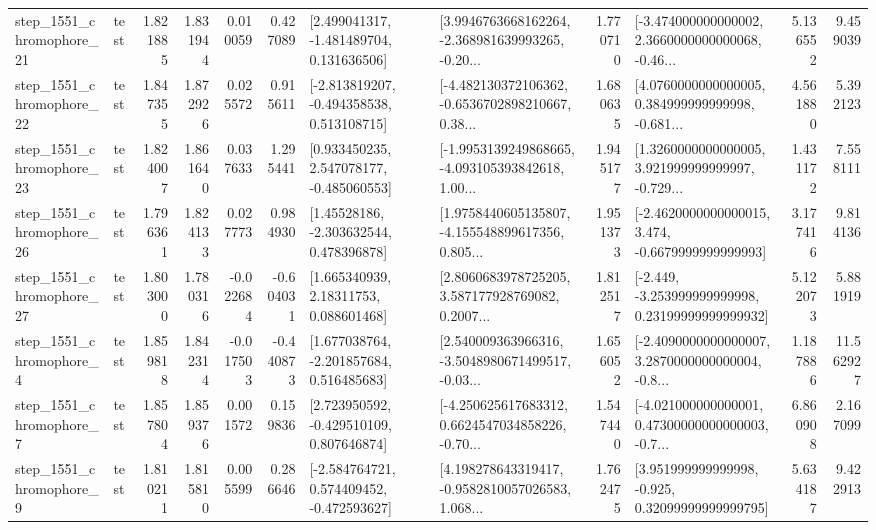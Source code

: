 \begin{tabular}{llrrrrllrlrr}
 step\_1551\_chromophore\_21 &      test &      1.821885 &    1.831944 &      0.010059 &  0.427089 &    [2.499041317, -1.481489704, 0.131636506] &  [3.9946763668162264, -2.368981639993265, -0.20... &       1.770710 &  [-3.474000000000002, 2.3660000000000068, -0.46... &            5.136552 &          9.459039 \\
 step\_1551\_chromophore\_22 &      test &      1.847355 &    1.872926 &      0.025572 &  0.915611 &   [-2.813819207, -0.494358538, 0.513108715] &  [-4.482130372106362, -0.6536702898210667, 0.38... &       1.680635 &  [4.0760000000000005, 0.384999999999998, -0.681... &            4.561880 &          5.392123 \\
 step\_1551\_chromophore\_23 &      test &      1.824007 &    1.861640 &      0.037633 &  1.295441 &    [0.933450235, 2.547078177, -0.485060553] &  [-1.9953139249868665, -4.093105393842618, 1.00... &       1.945177 &  [1.3260000000000005, 3.921999999999997, -0.729... &            1.431172 &          7.558111 \\
 step\_1551\_chromophore\_26 &      test &      1.796361 &    1.824133 &      0.027773 &  0.984930 &     [1.45528186, -2.303632544, 0.478396878] &  [1.9758440605135807, -4.155548899617356, 0.805... &       1.951373 &  [-2.4620000000000015, 3.474, -0.6679999999999993] &            3.177416 &          9.814136 \\
 step\_1551\_chromophore\_27 &      test &      1.803000 &    1.780316 &     -0.022684 & -0.604031 &      [1.665340939, 2.18311753, 0.088601468] &  [2.8060683978725205, 3.587177928769082, 0.2007... &       1.812517 &  [-2.449, -3.253999999999998, 0.23199999999999932] &            5.122073 &          5.881919 \\
  step\_1551\_chromophore\_4 &      test &      1.859818 &    1.842314 &     -0.017503 & -0.440873 &    [1.677038764, -2.201857684, 0.516485683] &  [2.540009363966316, -3.5048980671499517, -0.03... &       1.656052 &  [-2.4090000000000007, 3.2870000000000004, -0.8... &            1.187886 &         11.562927 \\
  step\_1551\_chromophore\_7 &      test &      1.857804 &    1.859376 &      0.001572 &  0.159836 &    [2.723950592, -0.429510109, 0.807646874] &  [-4.250625617683312, 0.6624547034858226, -0.70... &       1.547440 &  [-4.021000000000001, 0.47300000000000003, -0.7... &            6.860908 &          2.167099 \\
  step\_1551\_chromophore\_9 &      test &      1.810211 &    1.815810 &      0.005599 &  0.286646 &   [-2.584764721, 0.574409452, -0.472593627] &  [4.198278643319417, -0.9582810057026583, 1.068... &       1.762475 &   [3.951999999999998, -0.925, 0.32099999999999795] &            5.634187 &          9.422913 \\

\end{tabular}
